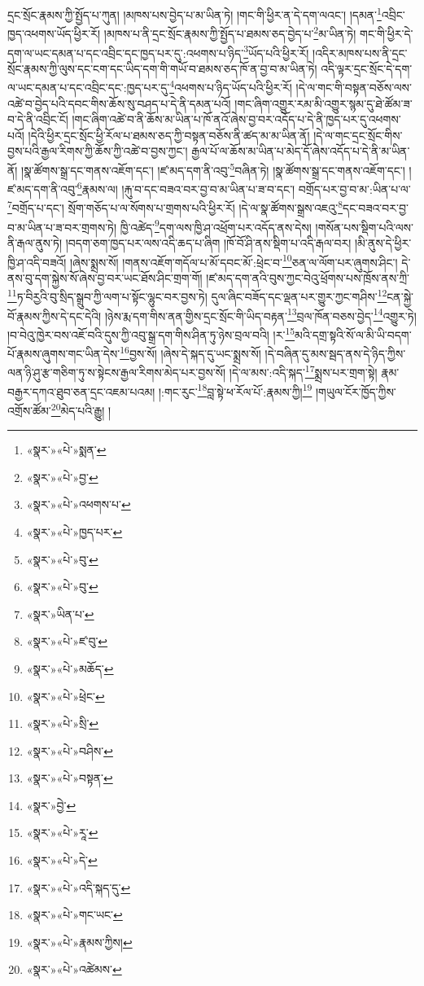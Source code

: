 དྲང་སྲོང་རྣམས་ཀྱི་སྤྱོད་པ་ཀུན། །མཁས་པས་བྱེད་པ་མ་ཡིན་ཏེ། །གང་གི་ཕྱིར་ན་དེ་དག་ལའང་། །དམན་\footnote{«སྣར་»«པེ་»སྨན་}འབྲིང་ཁྱད་འཕགས་ཡོད་ཕྱིར་རོ། །མཁས་པ་ནི་དྲང་སྲོང་རྣམས་ཀྱི་སྤྱོད་པ་ཐམས་ཅད་བྱེད་པ་\footnote{«སྣར་»«པེ་»བྱ་}མ་ཡིན་ཏེ། གང་གི་ཕྱིར་དེ་དག་ལ་ཡང་དམན་པ་དང་འབྲིང་དང་ཁྱད་པར་དུ་:འཕགས་པ་ཉིད་\footnote{«སྣར་»«པེ་»འཕགས་པ་}ཡོད་པའི་ཕྱིར་རོ། །འདིར་མཁས་པས་ནི་དྲང་སྲོང་རྣམས་ཀྱི་ལུས་དང་ངག་དང་ཡིད་དག་གི་གཡོ་བ་ཐམས་ཅད་ཁོ་ན་བྱ་བ་མ་ཡིན་ཏེ། འདི་ལྟར་དྲང་སྲོང་དེ་དག་ལ་ཡང་དམན་པ་དང་འབྲིང་དང་:ཁྱད་པར་དུ་\footnote{«སྣར་»«པེ་»ཁྱད་པར་}འཕགས་པ་ཉིད་ཡོད་པའི་ཕྱིར་རོ། །དེ་ལ་གང་གི་བསྟན་བཅོས་ལས་འཚེ་བ་བྱེད་པའི་དབང་གིས་ཆོས་སུ་བཤད་པ་དེ་ནི་དམན་པའོ། །གང་ཞིག་འགྱུར་རམ་མི་འགྱུར་སྙམ་དུ་ཐེ་ཚོམ་ཟ་བ་དེ་ནི་འབྲིང་ངོ། །གང་ཞིག་འཚེ་བ་ནི་ཆོས་མ་ཡིན་པ་ཁོ་ནའོ་ཞེས་བྱ་བར་འདོད་པ་དེ་ནི་ཁྱད་པར་དུ་འཕགས་པའོ། །དེའི་ཕྱིར་དྲང་སྲོང་ཕྱི་རོལ་པ་ཐམས་ཅད་ཀྱི་བསྟན་བཅོས་ནི་ཚད་མ་མ་ཡིན་ནོ། །དེ་ལ་གང་དྲང་སྲོང་གིས་བྱས་པའི་རྒྱལ་རིགས་ཀྱི་ཆོས་ཀྱི་འཚེ་བ་བྱས་ཀྱང་། རྒྱལ་པོ་ལ་ཆོས་མ་ཡིན་པ་མེད་དོ་ཞེས་འདོད་པ་དེ་ནི་མ་ཡིན་ནོ། །སྣ་ཚོགས་སྒྲ་དང་གནས་འཇོག་དང་། །ཛ་མད་དག་ནི་འབུ་\footnote{«སྣར་»«པེ་»བུ་}བཞིན་ཏེ། །སྣ་ཚོགས་སྒྲ་དང་གནས་འཇོག་དང་། །ཛ་མད་དག་ནི་འབུ་\footnote{«སྣར་»«པེ་»བུ་}རྣམས་ལ། །རྐུ་བ་དང་བཟའ་བར་བྱ་བ་མ་ཡིན་པ་ཟ་བ་དང་། བགྲོད་པར་བྱ་བ་མ་:ཡིན་པ་ལ་\footnote{«སྣར་»ཡིན་པ་}བགྲོད་པ་དང་། སྲོག་གཅོད་པ་ལ་སོགས་པ་གྲགས་པའི་ཕྱིར་རོ། །དེ་ལ་སྣ་ཚོགས་སྒྲས་འཇའུ་\footnote{«སྣར་»«པེ་»ཛ་བུ་}དང་བཟའ་བར་བྱ་བ་མ་ཡིན་པ་ཟ་བར་གྲགས་ཏེ། ཁྱི་འཚེད་\footnote{«སྣར་»«པེ་»མཆོད་}དག་ལས་ཁྱི་ཤ་འཕྲོག་པར་འདོད་ནས་དེས། །གསོན་པས་སྡིག་པའི་ལས་ནི་རྒལ་ནུས་ཏེ། །བདག་ཅག་ཁྱད་པར་ལས་འདི་ཆད་པ་ཞིག །ཁོ་བོ་ཤི་ནས་སྡིག་པ་འདི་རྒལ་བར། །མི་ནུས་དེ་ཕྱིར་ཁྱི་ཤ་འདི་བཟའོ། །ཞེས་སྨྲས་སོ། །གནས་འཇོག་གདོལ་པ་མོ་དབང་མོ་:ཕྲེང་བ་\footnote{«སྣར་»«པེ་»ཕྲེང་}ཅན་ལ་ལོག་པར་ཞུགས་ཤིང་། དེ་ནས་བུ་དག་སྐྱེས་སོ་ཞེས་བྱ་བར་ཡང་ཐོས་ཤིང་གྲག་གོ། །ཛ་མད་དག་ནའི་བུས་ཀྱང་བེའུ་ཕྲོགས་པས་ཁྲོས་ནས་ཀྲི་\footnote{«སྣར་»«པེ་»སྲི་}ཏ་བིརྱའི་བུ་སྲིད་སྒྲུབ་ཀྱི་ལག་པ་སྟོང་ལྷུང་བར་བྱས་ཏེ། དུལ་ཞིང་བཟོད་དང་ལྡན་པར་གྱུར་ཀྱང་གཤིས་\footnote{«སྣར་»«པེ་»བཤིས་}ངན་སྐྱེ་བོ་རྣམས་ཀྱིས་དེ་དང་དེའི། །ཉེས་རྨ་དག་གིས་ནན་གྱིས་དྲང་སྲོང་གི་ཡིད་བརྟན་\footnote{«སྣར་»«པེ་»བསྟན་}བྲལ་ཁོན་བཅས་བྱེད་\footnote{«སྣར་»བྱེ་}འགྱུར་ཏེ། །བ་བེའུ་ཁྱེར་བས་འཇོ་བའི་དུས་ཀྱི་འབུ་སྒྲ་དག་གིས་ཤིན་ཏུ་ཉེས་བྲལ་བའི། །ར་\footnote{«སྣར་»«པེ་»རཱ་}མའི་དགྲ་སྟའི་སོ་ལ་མི་ཡི་བདག་པོ་རྣམས་ཞུགས་གང་ཡིན་དེས་\footnote{«སྣར་»«པེ་»དེ་}བྱས་སོ། །ཞེས་དེ་སྐད་དུ་ཡང་སྨྲས་སོ། །དེ་བཞིན་དུ་མས་སྦད་ནས་དེ་ཉིད་ཀྱིས་ལན་ཉི་ཤུ་རྩ་གཅིག་ཏུ་ས་སྟེངས་རྒྱལ་རིགས་མེད་པར་བྱས་སོ། །དེ་ལ་མས་:འདི་སྐད་\footnote{«སྣར་»«པེ་»འདི་སྐད་དུ་}སྨྲས་པར་གྲག་སྟེ། རྣམ་བརྒྱར་དཀའ་ཐུབ་ཅན་དྲང་འཇམ་པའམ། །:གང་རུང་\footnote{«སྣར་»«པེ་»གང་ཡང་}བླ་སྟེ་ཕ་རོལ་པོ་:རྣམས་ཀྱི།\footnote{«སྣར་»«པེ་»རྣམས་ཀྱིས།} །གཡུལ་ངོར་ཁྱོད་ཀྱིས་འགྲོས་ཚོམ་\footnote{«སྣར་»«པེ་»འཚེམས་}མེད་པའི་རྒྱུ། །
